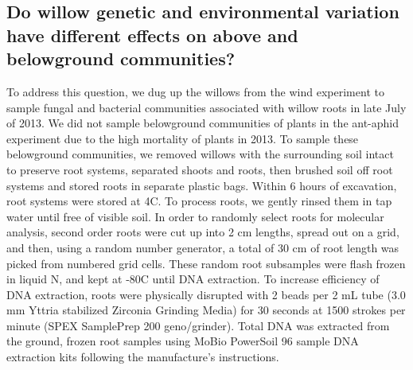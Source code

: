 \documentclass[11pt]{article}
\begin{document}
\subsection*{Do willow genetic and environmental variation have different
effects on above and belowground
communities?}

To address this question, we dug up the willows from the wind experiment
to sample fungal and bacterial communities associated with willow roots
in late July of 2013. We did not sample belowground communities of
plants in the ant-aphid experiment due to the high mortality of plants
in 2013. To sample these belowground communities, we removed willows
with the surrounding soil intact to preserve root systems, separated
shoots and roots, then brushed soil off root systems and stored roots in
separate plastic bags. Within 6 hours of excavation, root systems were
stored at 4\degree C. To process roots, we gently rinsed them in tap water
until free of visible soil. In order to randomly select roots for
molecular analysis, second order roots were cut up into 2 cm lengths,
spread out on a grid, and then, using a random number generator, a total
of 30 cm of root length was picked from numbered grid cells. These
random root subsamples were flash frozen in liquid N, and kept at -80\degree C
until DNA extraction. To increase efficiency of DNA extraction, roots
were physically disrupted with 2 beads per 2 mL tube (3.0 mm Yttria
stabilized Zirconia Grinding Media) for 30 seconds at 1500 strokes per
minute (SPEX SamplePrep 200 geno/grinder). Total DNA was extracted from
the ground, frozen root samples using MoBio PowerSoil 96 sample DNA
extraction kits following the manufacture's instructions.
\end{document}

